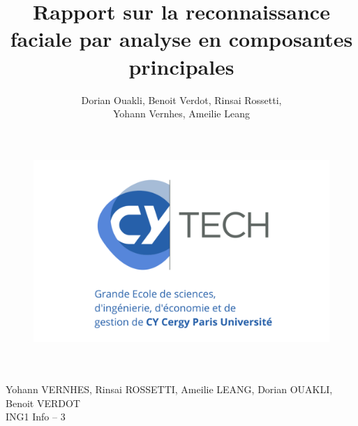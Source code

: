 \documentclass[a4paper,10pt]{report}
\title{Rapport sur la reconnaissance
faciale par analyse en composantes principales}
\author{Dorian Ouakli, Benoit Verdot, Rinsai Rossetti,\\ Yohann Vernhes, Ameilie Leang}
\makeatletter
\let\thetitle\@title
\let\thedate\@date
\makeatother
\begin{document}
    \begin{titlepage}
        \begin{figure}[h]
        \centering
            \includegraphics[scale=0.17]{assets/logocytech.png}
        \end{figure}

    \vspace{3cm}

    \begin{center}
        \huge{\textbf{\thetitle}} \\
        \vspace{0.7cm}
        \Large{\thedate} \\
        \vspace{10cm}
        \Large{Yohann  \textsc{VERNHES}, Rinsai  \textsc{ROSSETTI}, Ameilie  \textsc{LEANG}, Dorian  \textsc{OUAKLI}, Benoit  \textsc{VERDOT} \\ ING1 Info -- 3}
    \end{center}
    \end{titlepage}
    \restoregeometry

    \clearpage

    \tableofcontents
    \clearpage

    
    \clearpage

    
    \clearpage

    
    \clearpage

    
    \clearpage

    
    \clearpage
\end{document}
